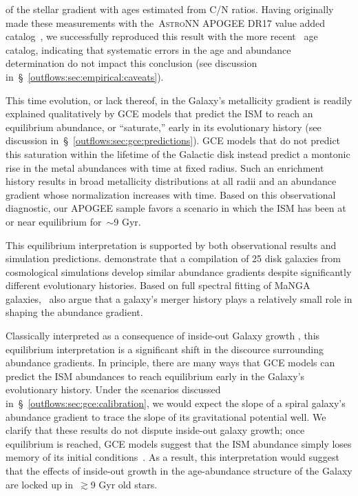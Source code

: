 of the stellar gradient with ages estimated from C/N ratios.
Having originally made these measurements with the~\textsc{AstroNN} APOGEE DR17
value added catalog~\citep{Mackereth2019b}, we successfully reproduced this
result with the more recent~\citet{Leung2023} age catalog, indicating that
systematic errors in the age and abundance determination do not impact this
conclusion (see discussion in~\S~\ref{outflows:sec:empirical:caveats}).
\par
This time evolution, or lack thereof, in the Galaxy's metallicity gradient
is readily explained qualitatively by GCE models that predict the ISM to reach
an equilibrium abundance, or ``saturate,'' early in its evolutionary history
(see discussion in~\S~\ref{outflows:sec:gce:predictions}).
GCE models that do not predict this saturation within the lifetime of the
Galactic disk instead predict a montonic rise in the metal abundances with time
at fixed radius.
Such an enrichment history results in broad metallicity distributions at all
radii and an abundance gradient whose normalization increases with time.
Based on this observational diagnostic, our APOGEE sample favors a scenario
in which the ISM has been at or near equilibrium for~$\sim$9 Gyr.
\par
This equilibrium interpretation is supported by both observational results and
simulation predictions.
\citet{Pilkington2012} demonstrate that a compilation of 25 disk galaxies from
cosmological simulations develop similar abundance gradients despite
significantly different evolutionary histories.
Based on full spectral fitting of MaNGA galaxies,~\citet{Goddard2017} also
argue that a galaxy's merger history plays a relatively small role in shaping
the abundance gradient.
\par
Classically interpreted as a consequence of inside-out Galaxy growth
\citep{Kauffmann1996}, this equilibrium interpretation is a significant shift
in the discource surrounding abundance gradients.
In principle, there are many ways that GCE models can predict the ISM
abundances to reach equilibrium early in the Galaxy's evolutionary history.
Under the scenarios discussed in~\S~\ref{outflows:sec:gce:calibration}, we
would expect the slope of a spiral galaxy's abundance gradient to trace the
slope of its gravitational potential well.
We clarify that these results do not dispute inside-out galaxy growth; once
equilibrium is reached, GCE models suggest that the ISM abundance simply loses
memory of its initial conditions~\citep[see, e.g.,][]{Weinberg2017b}.
As a result, this interpretation would suggest that the effects of inside-out
growth in the age-abundance structure of the Galaxy are locked up
in~$\gtrsim$9 Gyr old stars.

